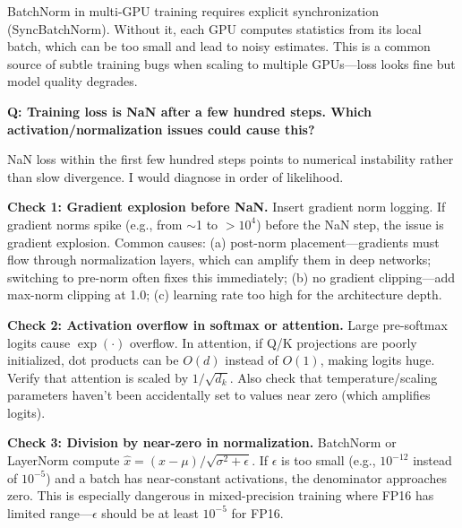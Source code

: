 \begin{warningbox}
BatchNorm in multi-GPU training requires explicit synchronization (SyncBatchNorm). Without it, each GPU computes statistics from its local batch, which can be too small and lead to noisy estimates. This is a common source of subtle training bugs when scaling to multiple GPUs---loss looks fine but model quality degrades.
\end{warningbox}


\begin{interviewq}
\textbf{Q: Training loss is NaN after a few hundred steps. Which activation/normalization issues could cause this?}

 \quad {} \quad \badgefreq{\freqhigh}

\stronganswer

NaN loss within the first few hundred steps points to numerical instability rather than slow divergence. I would diagnose in order of likelihood.

\textbf{Check 1: Gradient explosion before NaN.} Insert gradient norm logging. If gradient norms spike (e.g., from $\sim$1 to $>10^4$) before the NaN step, the issue is gradient explosion. Common causes: (a) post-norm placement---gradients must flow through normalization layers, which can amplify them in deep networks; switching to pre-norm often fixes this immediately; (b) no gradient clipping---add max-norm clipping at 1.0; (c) learning rate too high for the architecture depth.

\textbf{Check 2: Activation overflow in softmax or attention.} Large pre-softmax logits cause $\exp(\cdot)$ overflow. In attention, if Q/K projections are poorly initialized, dot products can be $O(d)$ instead of $O(1)$, making logits huge. Verify that attention is scaled by $1/\sqrt{d_k}$. Also check that temperature/scaling parameters haven't been accidentally set to values near zero (which amplifies logits).

\textbf{Check 3: Division by near-zero in normalization.} BatchNorm or LayerNorm compute $\hat{x} = (x - \mu)/\sqrt{\sigma^2 + \epsilon}$. If $\epsilon$ is too small (e.g., $10^{-12}$ instead of $10^{-5}$) and a batch has near-constant activations, the denominator approaches zero. This is especially dangerous in mixed-precision training where FP16 has limited range---$\epsilon$ should be at least $10^{-5}$ for FP16.


\end{interviewq}
